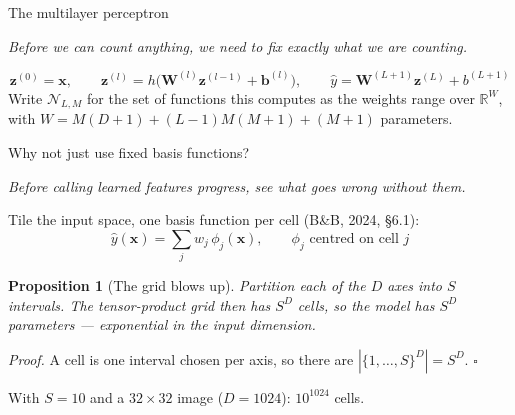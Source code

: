 \documentclass[aspectratio=169, 11pt]{beamer}
\newtheorem{propx}[theorem]{Proposition}
\newcommand{\bridge}[1]{%
  {\scriptsize\itshape\color{mcMuted} #1\par}\vspace{0.35em}}
\newcommand{\unit}[4]{%
  \node[circle, draw=#3, fill=#3!6, line width=0.7pt,
        minimum size=10mm, inner sep=0pt] (#1) at #2 {};
  \begin{scope}
    \clip #2 circle (0.5);
    \draw[tealc, line width=1.1pt]
      ($#2+(-0.50,-0.26)$) -- ($#2+(0.02,-0.26)$) -- ($#2+(0.46,0.28)$);
  \end{scope}
  \node[font=\large, #3] at ($#2+(0,0.78)$) {#4};
}
\newcommand{\plainunit}[4]{%
  \node[circle, draw=#3, fill=black!4, line width=0.7pt,
        minimum size=10mm, inner sep=0pt, font=\small] (#1) at #2 {#4};
}
\begin{document}
\begin{frame}{The multilayer perceptron}
  \bridge{Before we can count anything, we need to fix exactly what we
  are counting.}
  \centering
  \vspace{0.0em}
  \[
    \mathbf{z}^{(0)}=\mathbf{x},
    \qquad
    \mathbf{z}^{(l)} = h\big(\mathbf{W}^{(l)}\mathbf{z}^{(l-1)}
    + \mathbf{b}^{(l)}\big),
    \qquad
    \hat y = \mathbf{W}^{(L+1)}\mathbf{z}^{(L)} + b^{(L+1)}
  \]
  {\scriptsize Write $\mathcal{N}_{L,M}$ for the set of functions this
  computes as the weights range over $\mathbb{R}^{W}$, with
  $W = M(D{+}1) + (L{-}1)M(M{+}1) + (M{+}1)$ parameters.}
\end{frame}

\begin{frame}{Why not just use fixed basis functions?}
  \bridge{Before calling learned features progress, see what goes
  wrong without them.}
  Tile the input space, one basis function per cell
  (B\&B, 2024, \S6.1):
  \[
    \hat y(\mathbf{x}) = \sum_{j} w_j\,\phi_j(\mathbf{x}),
    \qquad
    \phi_j \text{ centred on cell } j
  \]
  \vspace{0.05em}
  \begin{propx}[The grid blows up]
    {\small Partition each of the $D$ axes into $S$ intervals. The
    tensor-product grid then has \alert{$S^{D}$} cells, so the model has
    $S^{D}$ parameters --- exponential in the input dimension.}
  \end{propx}
  \vspace{-0.05em}
  {\footnotesize
  \emph{Proof.} A cell is one interval chosen per axis, so there are
  $|\{1,\dots,S\}^{D}| = S^{D}$. \hfill$\square$}

  \vspace{0.7em}
  {\footnotesize With $S=10$ and a $32\times32$ image ($D=1024$):
  $10^{1024}$ cells.}
\end{frame}
\end{document}
